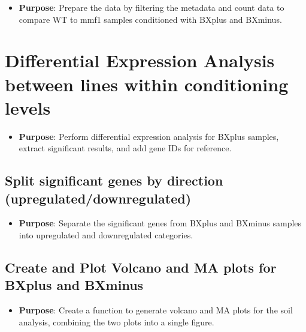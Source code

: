 \documentclass[
  11pt,
]{article}
\providecommand{\tightlist}{%
  \setlength{\itemsep}{0pt}\setlength{\parskip}{0pt}}\usepackage{longtable,booktabs,array}
\begin{document}
\begin{itemize}
\tightlist
\item
  \textbf{Purpose}: Prepare the data by filtering the metadata and count
  data to compare WT to mmf1 samples conditioned with BXplus and
  BXminus.
\end{itemize}

\section{Differential Expression Analysis between lines within
conditioning
levels}\label{differential-expression-analysis-between-lines-within-conditioning-levels}

\begin{itemize}
\tightlist
\item
  \textbf{Purpose}: Perform differential expression analysis for BXplus
  samples, extract significant results, and add gene IDs for reference.
\end{itemize}

\subsection{Split significant genes by direction
(upregulated/downregulated)}\label{split-significant-genes-by-direction-upregulateddownregulated}

\begin{itemize}
\tightlist
\item
  \textbf{Purpose}: Separate the significant genes from BXplus and
  BXminus samples into upregulated and downregulated categories.
\end{itemize}

\subsection{Create and Plot Volcano and MA plots for BXplus and
BXminus}\label{create-and-plot-volcano-and-ma-plots-for-bxplus-and-bxminus}

\begin{itemize}
\tightlist
\item
  \textbf{Purpose}: Create a function to generate volcano and MA plots
  for the soil analysis, combining the two plots into a single figure.
\end{itemize}
\end{document}
